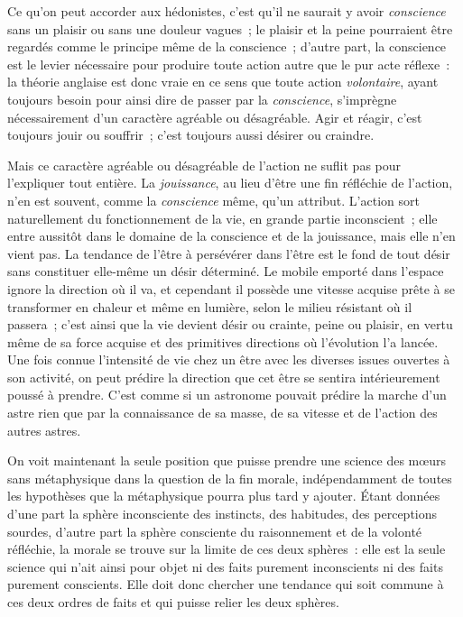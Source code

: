 \documentclass[french,twoside]{book} %
\begin{document}
Ce qu’on peut accorder aux hédonistes, c’est qu’il ne saurait y avoir \emph{conscience} sans un plaisir ou sans une douleur vagues ; le plaisir et la peine pourraient être regardés comme le principe même de la conscience ; d’autre part, la conscience est le levier nécessaire pour produire toute action autre que le pur acte réflexe : la théorie anglaise est donc vraie en ce sens que toute action \emph{volontaire}, ayant toujours besoin pour ainsi dire de passer par la \emph{conscience}, s’imprègne nécessairement d’un caractère agréable ou désagréable. Agir et réagir, c’est toujours jouir ou souffrir ; c’est toujours aussi désirer ou craindre.\par
Mais ce caractère agréable ou désagréable de l’action ne suflit pas pour l’expliquer tout entière. La \emph{jouissance}, au lieu d’être une fin réfléchie de l’action, n’en est souvent, comme la \emph{conscience} même, qu’un attribut. L’action sort naturellement du fonctionnement de la vie, en grande partie inconscient ; elle entre aussitôt dans le domaine de la conscience et de la jouissance, mais elle n’en vient pas. La tendance de l’être à persévérer dans l’être est le fond de tout désir sans constituer elle-même un désir déterminé. Le mobile emporté dans l’espace ignore la direction où il va, et cependant il possède une vitesse acquise prête à se transformer en chaleur et même en lumière, selon le milieu résistant où il passera ; c’est ainsi que la vie devient désir ou crainte, peine ou plaisir, en vertu même de sa force acquise et des primitives directions où l’évolution l’a lancée. Une fois connue l’intensité de vie chez un être avec les diverses issues ouvertes à son activité, on peut prédire la direction que cet être se sentira intérieurement poussé à prendre. C’est comme si un astronome pouvait prédire la marche d’un astre rien que par la connaissance de sa masse, de sa vitesse et de l’action des autres astres.\par
On voit maintenant la seule position que puisse prendre une science des mœurs sans métaphysique dans la question de la fin morale, indépendamment de toutes les hypothèses que la métaphysique pourra plus tard y ajouter. Étant données d’une part la sphère inconsciente des instincts, des habitudes, des perceptions sourdes, d’autre part la sphère consciente du raisonnement et de la volonté réfléchie, la morale se trouve sur la limite de ces deux sphères : elle est la seule science qui n’ait ainsi pour objet ni des faits purement inconscients ni des faits purement conscients. Elle doit donc chercher une tendance qui soit commune à ces deux ordres de faits et qui puisse relier les deux sphères.\par
\end{document}
